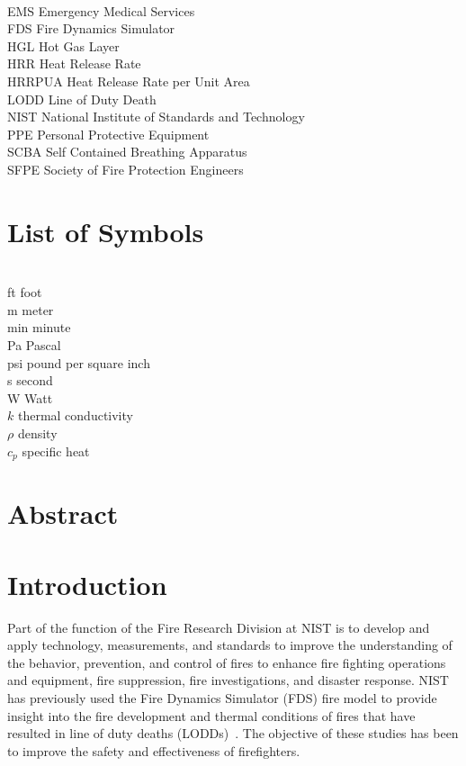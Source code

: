 \documentclass[12pt,oneside]{book}
\begin{document}
\begin{tabbing}
\hspace{1.5in} \= \\
EMS \> Emergency Medical Services \\
FDS \> Fire Dynamics Simulator \\
HGL \> Hot Gas Layer \\
HRR \> Heat Release Rate \\
HRRPUA \> Heat Release Rate per Unit Area \\
LODD \> Line of Duty Death \\
NIST \> National Institute of Standards and Technology \\
PPE \> Personal Protective Equipment \\
SCBA \> Self Contained Breathing Apparatus \\
SFPE \> Society of Fire Protection Engineers \\
\end{tabbing}

\chapter{List of Symbols}

\begin{tabbing}
\hspace{1.5in} \= \\
ft \> foot \\
m \> meter \\
min \> minute \\
Pa \> Pascal \\
psi \> pound per square inch \\
s \> second \\
W \> Watt \\
$k$ \> thermal conductivity \\
$\rho$ \> density \\
$c_{p}$ \> specific heat \\
\end{tabbing}

\mainmatter

\chapter*{\centering Abstract}

\chapter{Introduction}
\setcounter{page}{1}
Part of the function of the Fire Research Division at NIST is to develop and apply technology, measurements, and standards to improve the understanding of the behavior, prevention, and control of fires to enhance fire fighting operations and equipment, fire suppression, fire investigations, and disaster response. NIST has previously used the Fire Dynamics Simulator (FDS) fire model to provide insight into the fire development and thermal conditions of fires that have resulted in line of duty deaths (LODDs)~\cite{Madrzykowski:1,Iowa,Texas,Bryner:Charleston,barowy:texas}. The objective of these studies has been to improve the safety and effectiveness of firefighters.
\end{document}
